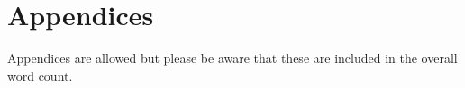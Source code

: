 \documentclass{IET}%
\begin{document}


%
%
%
%
%
%
%
%
%
%
%
%
%
%
%
%
%
%
%
%
%
%
%
%
\section{Appendices}
%
Appendices are allowed but please be aware that these are included in the overall word count.
\end{document}
